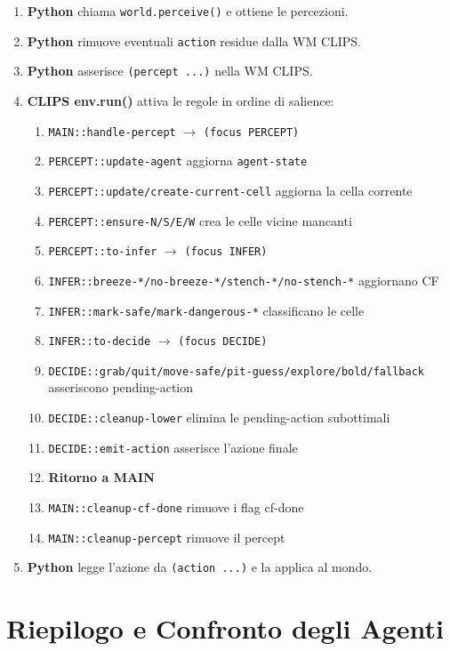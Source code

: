\documentclass[12pt,a4paper]{article}
\begin{document}
\begin{enumerate}
  \item \textbf{Python} chiama \texttt{world.perceive()} e ottiene le percezioni.
  \item \textbf{Python} rimuove eventuali \texttt{action} residue dalla WM CLIPS.
  \item \textbf{Python} asserisce \texttt{(percept ...)} nella WM CLIPS.
  \item \textbf{CLIPS env.run()} attiva le regole in ordine di salience:
    \begin{enumerate}[noitemsep,label=4\alph*.]
      \item \texttt{MAIN::handle-percept} $\to$ \texttt{(focus PERCEPT)}
      \item \texttt{PERCEPT::update-agent} aggiorna \texttt{agent-state}
      \item \texttt{PERCEPT::update/create-current-cell} aggiorna la cella corrente
      \item \texttt{PERCEPT::ensure-N/S/E/W} crea le celle vicine mancanti
      \item \texttt{PERCEPT::to-infer} $\to$ \texttt{(focus INFER)}
      \item \texttt{INFER::breeze-*/no-breeze-*/stench-*/no-stench-*} aggiornano CF
      \item \texttt{INFER::mark-safe/mark-dangerous-*} classificano le celle
      \item \texttt{INFER::to-decide} $\to$ \texttt{(focus DECIDE)}
      \item \texttt{DECIDE::grab/quit/move-safe/pit-guess/explore/bold/fallback} asseriscono pending-action
      \item \texttt{DECIDE::cleanup-lower} elimina le pending-action subottimali
      \item \texttt{DECIDE::emit-action} asserisce l'azione finale
      \item \textbf{Ritorno a MAIN}
      \item \texttt{MAIN::cleanup-cf-done} rimuove i flag cf-done
      \item \texttt{MAIN::cleanup-percept} rimuove il percept
    \end{enumerate}
  \item \textbf{Python} legge l'azione da \texttt{(action ...)} e la applica al mondo.
\end{enumerate}

\section{Riepilogo e Confronto degli Agenti}
\end{document}
